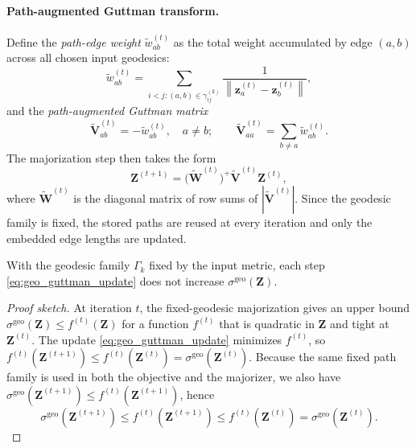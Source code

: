 \documentclass[twoside,11pt]{article}
\newcommand{\bz}{\mathbf{z}}
\newcommand{\bZ}{\mathbf{Z}}
\newcommand{\bV}{\mathbf{V}}
\newcommand{\bW}{\mathbf{W}}
\newcommand{\norm}[1]{\left\|#1\right\|}
\begin{document}
\paragraph{Path-augmented Guttman transform.}
Define the \emph{path-edge weight} $\tilde{w}_{ab}^{(t)}$ as the total
weight accumulated by edge $(a,b)$ across all chosen input geodesics:
\begin{equation}
  \tilde{w}_{ab}^{(t)}
  = \sum_{i < j : (a,b) \in \gamma_{ij}^{(k)}}
    \frac{1}{\norm{\bz^{(t)}_a - \bz^{(t)}_b}},
  \label{eq:path_edge_weight}
\end{equation}
and the \emph{path-augmented Guttman matrix}
\begin{equation}
  \tilde{\bV}^{(t)}_{ab}
  = -\tilde{w}^{(t)}_{ab}, \quad a \neq b; \qquad
  \tilde{\bV}^{(t)}_{aa}
  = \sum_{b \neq a} \tilde{w}^{(t)}_{ab}.
  \label{eq:augmented_guttman}
\end{equation}
The majorization step then takes the form
\begin{equation}
  \bZ^{(t+1)} = \bigl(\tilde{\bW}^{(t)}\bigr)^+ \tilde{\bV}^{(t)} \bZ^{(t)},
  \label{eq:geo_guttman_update}
\end{equation}
where $\tilde{\bW}^{(t)}$ is the diagonal matrix of row sums of
$|\tilde{\bV}^{(t)}|$.  Since the geodesic family is fixed, the stored
paths are reused at every iteration and only the embedded edge lengths are
updated.

\begin{proposition}
  \label{prop:monotone}
  With the geodesic family $\Gamma_k$ fixed by the input metric, each step
  \eqref{eq:geo_guttman_update} does not increase
  $\sigma^{\mathrm{geo}}(\bZ)$.
\end{proposition}

\begin{proof}[Proof sketch]
  At iteration $t$, the fixed-geodesic majorization gives an upper bound
  $\sigma^{\mathrm{geo}}(\bZ) \leq f^{(t)}(\bZ)$ for a function $f^{(t)}$
  that is quadratic in $\bZ$ and tight at $\bZ^{(t)}$.  The update
  \eqref{eq:geo_guttman_update} minimizes $f^{(t)}$, so
  $f^{(t)}(\bZ^{(t+1)}) \leq f^{(t)}(\bZ^{(t)}) =
  \sigma^{\mathrm{geo}}(\bZ^{(t)})$.  Because the same fixed path family is
  used in both the objective and the majorizer, we also have
  $\sigma^{\mathrm{geo}}(\bZ^{(t+1)}) \leq f^{(t)}(\bZ^{(t+1)})$, hence
  \[
    \sigma^{\mathrm{geo}}(\bZ^{(t+1)})
    \leq f^{(t)}(\bZ^{(t+1)})
    \leq f^{(t)}(\bZ^{(t)})
    = \sigma^{\mathrm{geo}}(\bZ^{(t)}).
  \]
\end{proof}
\end{document}

